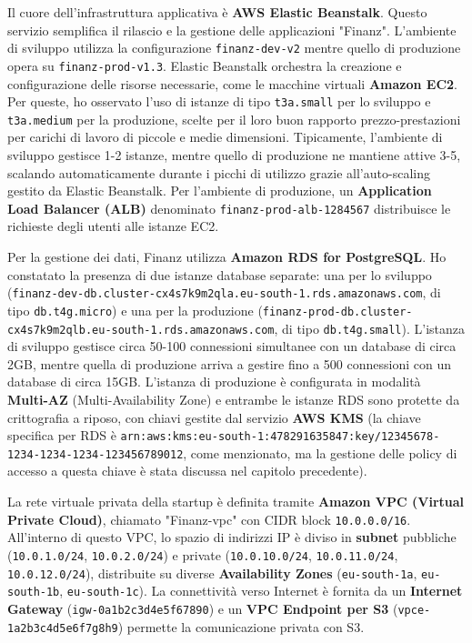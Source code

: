Il cuore dell'infrastruttura applicativa è \textbf{AWS Elastic Beanstalk}. Questo servizio semplifica il rilascio e la gestione delle applicazioni "Finanz". L'ambiente di sviluppo utilizza la configurazione \texttt{finanz-dev-v2} mentre quello di produzione opera su \texttt{finanz-prod-v1.3}. Elastic Beanstalk orchestra la creazione e configurazione delle risorse necessarie, come le macchine virtuali \textbf{Amazon EC2}. Per queste, ho osservato l'uso di istanze di tipo \texttt{t3a.small} per lo sviluppo e \texttt{t3a.medium} per la produzione, scelte per il loro buon rapporto prezzo-prestazioni per carichi di lavoro di piccole e medie dimensioni. Tipicamente, l'ambiente di sviluppo gestisce 1-2 istanze, mentre quello di produzione ne mantiene attive 3-5, scalando automaticamente durante i picchi di utilizzo grazie all'auto-scaling gestito da Elastic Beanstalk. Per l'ambiente di produzione, un \textbf{Application Load Balancer (ALB)} denominato \texttt{finanz-prod-alb-1284567} distribuisce le richieste degli utenti alle istanze EC2.

Per la gestione dei dati, Finanz utilizza \textbf{Amazon RDS for PostgreSQL}. Ho constatato la presenza di due istanze database separate: una per lo sviluppo (\texttt{finanz-dev-db.cluster-cx4s7k9m2qla.eu-south-1.rds.amazonaws.com}, di tipo \texttt{db.t4g.micro}) e una per la produzione (\texttt{finanz-prod-db.cluster-cx4s7k9m2qlb.eu-south-1.rds.amazonaws.com}, di tipo \texttt{db.t4g.small}). L'istanza di sviluppo gestisce circa 50-100 connessioni simultanee con un database di circa 2GB, mentre quella di produzione arriva a gestire fino a 500 connessioni con un database di circa 15GB. L'istanza di produzione è configurata in modalità \textbf{Multi-AZ} (Multi-Availability Zone) e entrambe le istanze RDS sono protette da crittografia a riposo, con chiavi gestite dal servizio \textbf{AWS KMS} (la chiave specifica per RDS è \texttt{arn:aws:kms:eu-south-1:478291635847:key/12345678-1234-1234-1234-123456789012}, come menzionato, ma la gestione delle policy di accesso a questa chiave è stata discussa nel capitolo precedente).

La rete virtuale privata della startup è definita tramite \textbf{Amazon VPC (Virtual Private Cloud)}, chiamato "Finanz-vpc" con CIDR block \texttt{10.0.0.0/16}. All'interno di questo VPC, lo spazio di indirizzi IP è diviso in \textbf{subnet} pubbliche (\texttt{10.0.1.0/24}, \texttt{10.0.2.0/24}) e private (\texttt{10.0.10.0/24}, \texttt{10.0.11.0/24}, \texttt{10.0.12.0/24}), distribuite su diverse \textbf{Availability Zones} (\texttt{eu-south-1a}, \texttt{eu-south-1b}, \texttt{eu-south-1c}). La connettività verso Internet è fornita da un \textbf{Internet Gateway} (\texttt{igw-0a1b2c3d4e5f67890}) e un \textbf{VPC Endpoint per S3} (\texttt{vpce-1a2b3c4d5e6f7g8h9}) permette la comunicazione privata con S3.

